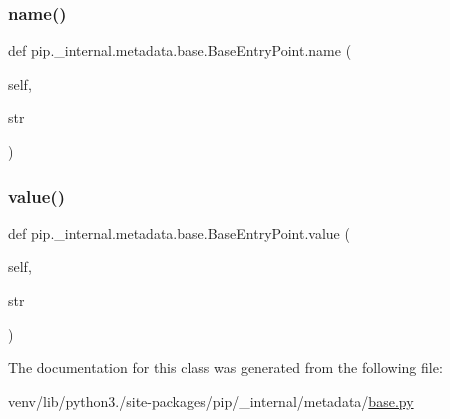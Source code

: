 \subsubsection{\texorpdfstring{name()}{name()}}
{\footnotesize\ttfamily def pip.\+\_\+internal.\+metadata.\+base.\+Base\+Entry\+Point.\+name (\begin{DoxyParamCaption}\item[{}]{self,  }\item[{}]{str }\end{DoxyParamCaption})}

\mbox{\label{classpip_1_1__internal_1_1metadata_1_1base_1_1BaseEntryPoint_a95d065b52c014ba8a30cb144aa3e8920}} 
\subsubsection{\texorpdfstring{value()}{value()}}
{\footnotesize\ttfamily def pip.\+\_\+internal.\+metadata.\+base.\+Base\+Entry\+Point.\+value (\begin{DoxyParamCaption}\item[{}]{self,  }\item[{}]{str }\end{DoxyParamCaption})}



The documentation for this class was generated from the following file\+:\begin{DoxyCompactItemize}
\item 
venv/lib/python3./site-\/packages/pip/\+\_\+internal/metadata/\hyperlink{__internal_2metadata_2base_8py}{base.\+py}\end{DoxyCompactItemize}
